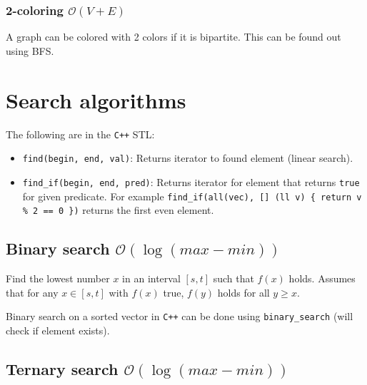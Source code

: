 \subsubsection{2-coloring $\mathcal O(V + E)$}
A graph can be colored with 2 colors if it is bipartite. This can be found out using BFS.






\section{Search algorithms}
The following are in the \texttt{C++} STL:
\begin{itemize}
    \item \texttt{find(begin, end, val)}: Returns iterator to found element (linear search).
    \item \texttt{find\_if(begin, end, pred)}: Returns iterator for element that returns \texttt{true} for given predicate. For example \texttt{find\_if(all(vec), [] (ll v) \{ return v \% 2 == 0 \})} returns the first even element.
\end{itemize}

\subsection{Binary search $\mathcal O(\log(max - min))$}

Find the lowest number $x$ in an interval $[s, t]$ such that $f(x)$ holds. Assumes that for any $x \in [s, t]$ with $f(x)$ true, $f(y)$ holds for all $y \geq x$.

Binary search on a sorted vector in \texttt{C++} can be done using \texttt{binary\_search} (will check if element exists).

\subsection{Ternary search $\mathcal O(\log(max - min))$}

